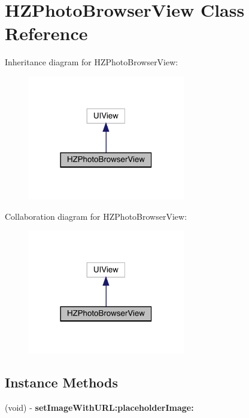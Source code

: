 \hypertarget{interface_h_z_photo_browser_view}{}\section{H\+Z\+Photo\+Browser\+View Class Reference}
\label{interface_h_z_photo_browser_view}


Inheritance diagram for H\+Z\+Photo\+Browser\+View\+:\nopagebreak
\begin{figure}[H]
\begin{center}
\leavevmode
\includegraphics[width=194pt]{interface_h_z_photo_browser_view__inherit__graph}
\end{center}
\end{figure}


Collaboration diagram for H\+Z\+Photo\+Browser\+View\+:\nopagebreak
\begin{figure}[H]
\begin{center}
\leavevmode
\includegraphics[width=194pt]{interface_h_z_photo_browser_view__coll__graph}
\end{center}
\end{figure}
\subsection*{Instance Methods}
\begin{DoxyCompactItemize}
\item 
\mbox{\label{interface_h_z_photo_browser_view_a769c5ea35ca2d14ac3e19341433732d8}} 
(void) -\/ {\bfseries set\+Image\+With\+U\+R\+L\+:placeholder\+Image\+:}
\end{DoxyCompactItemize}

